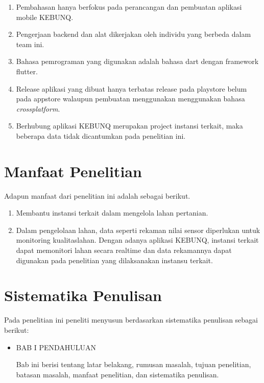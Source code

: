 \begin{flushleft}
\begin{justify}
\end{justify}
\begin{enumerate}
  \item Pembahasan hanya berfokus pada perancangan dan pembuatan aplikasi mobile KEBUNQ.
  \item Pengerjaan backend dan alat dikerjakan oleh individu yang berbeda dalam team ini.
  \item Bahasa pemrograman yang digunakan adalah bahasa dart dengan framework flutter.
  \item Release aplikasi yang dibuat hanya terbatas release pada playstore belum pada appstore walaupun pembuatan menggunakan menggunakan bahasa \textit{crossplatform}.
  \item Berhubung aplikasi KEBUNQ merupakan project instansi terkait, maka beberapa data tidak dicantumkan pada penelitian ini.

  \end{enumerate}
\vspace{2cm}


\section{Manfaat Penelitian}

\begin{justify}
  Adapun manfaat dari penelitian ini adalah sebagai berikut.


\end{justify}
\begin{enumerate}
  \item Membantu instansi terkait dalam mengelola lahan pertanian.
  \item Dalam pengelolaan lahan, data seperti rekaman nilai sensor diperlukan untuk monitoring kualitaslahan. Dengan adanya aplikasi KEBUNQ, instansi terkait dapat memonitori lahan secara realtime dan data rekamannya dapat digunakan pada penelitian yang dilaksanakan instansu terkait.

  \end{enumerate}
\vspace{2cm}



\section{Sistematika Penulisan}
Pada penelitian ini peneliti menyusun berdasarkan sistematika penulisan sebagai berikut: \\
\begin{itemize}
  \item \noindent BAB I PENDAHULUAN
  \begin{justify}
  Bab ini berisi tentang latar belakang, rumusan masalah, tujuan penelitian, 
  batasan masalah, manfaat penelitian, dan sistematika penulisan.
  \end{justify}
\end{itemize}


\end{flushleft}
